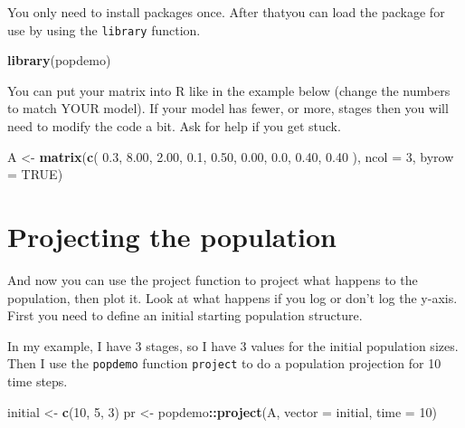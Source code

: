 \documentclass[
  a4paper]{book}
\newenvironment{Shaded}{\begin{snugshade}}{\end{snugshade}}
\newcommand{\AttributeTok}[1]{\textcolor[rgb]{0.13,0.29,0.53}{#1}}
\newcommand{\ConstantTok}[1]{\textcolor[rgb]{0.56,0.35,0.01}{#1}}
\newcommand{\DecValTok}[1]{\textcolor[rgb]{0.00,0.00,0.81}{#1}}
\newcommand{\FloatTok}[1]{\textcolor[rgb]{0.00,0.00,0.81}{#1}}
\newcommand{\FunctionTok}[1]{\textcolor[rgb]{0.13,0.29,0.53}{\textbf{#1}}}
\newcommand{\NormalTok}[1]{#1}
\newcommand{\OtherTok}[1]{\textcolor[rgb]{0.56,0.35,0.01}{#1}}
\newcommand{\SpecialCharTok}[1]{\textcolor[rgb]{0.81,0.36,0.00}{\textbf{#1}}}
\begin{document}
You only need to install packages once. After thatyou can load the package for use by using the \texttt{library} function.

\begin{Shaded}
\begin{Highlighting}[]
\FunctionTok{library}\NormalTok{(popdemo)}
\end{Highlighting}
\end{Shaded}

You can put your matrix into R like in the example below (change the numbers to match YOUR model). If your model has fewer, or more, stages then you will need to modify the code a bit. Ask for help if you get stuck.

\begin{Shaded}
\begin{Highlighting}[]
\NormalTok{A }\OtherTok{\textless{}{-}} \FunctionTok{matrix}\NormalTok{(}\FunctionTok{c}\NormalTok{(}
  \FloatTok{0.3}\NormalTok{, }\FloatTok{8.00}\NormalTok{, }\FloatTok{2.00}\NormalTok{,}
  \FloatTok{0.1}\NormalTok{, }\FloatTok{0.50}\NormalTok{, }\FloatTok{0.00}\NormalTok{,}
  \FloatTok{0.0}\NormalTok{, }\FloatTok{0.40}\NormalTok{, }\FloatTok{0.40}
\NormalTok{), }\AttributeTok{ncol =} \DecValTok{3}\NormalTok{, }\AttributeTok{byrow =} \ConstantTok{TRUE}\NormalTok{)}
\end{Highlighting}
\end{Shaded}

\hypertarget{projecting-the-population}{%
\section{Projecting the population}\label{projecting-the-population}}

And now you can use the project function to project what happens to the population, then plot it. Look at what happens if you log or don't log the y-axis. First you need to define an initial starting population structure.

In my example, I have 3 stages, so I have 3 values for the initial population sizes. Then I use the \texttt{popdemo} function \texttt{project} to do a population projection for 10 time steps.

\begin{Shaded}
\begin{Highlighting}[]
\NormalTok{initial }\OtherTok{\textless{}{-}} \FunctionTok{c}\NormalTok{(}\DecValTok{10}\NormalTok{, }\DecValTok{5}\NormalTok{, }\DecValTok{3}\NormalTok{)}
\NormalTok{pr }\OtherTok{\textless{}{-}}\NormalTok{ popdemo}\SpecialCharTok{::}\FunctionTok{project}\NormalTok{(A, }\AttributeTok{vector =}\NormalTok{ initial, }\AttributeTok{time =} \DecValTok{10}\NormalTok{)}
\end{Highlighting}
\end{Shaded}
\end{document}
